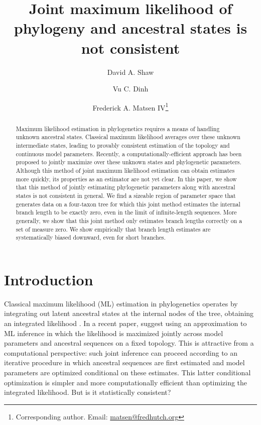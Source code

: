 \documentclass[11pt]{article}
\title{Joint maximum likelihood of phylogeny and ancestral states is not consistent}
\author[1]{David A. Shaw}
\author[2]{Vu C. Dinh}
\author[1]{Frederick A. Matsen IV\thanks{Corresponding author. Email: \url{matsen@fredhutch.org}}}
\affil[1]{Computational Biology Program, Fred Hutchinson Cancer Research Center\\ Seattle, WA, USA}
\affil[2]{Department of Mathematical Sciences, University of Delaware\\ Newark, DE, USA}
\date{}
\begin{document}
\renewcommand{\arraystretch}{1.2} %

\maketitle

\begin{abstract}
Maximum likelihood estimation in phylogenetics requires a means of handling unknown ancestral states.
Classical maximum likelihood averages over these unknown intermediate states, leading to provably consistent estimation of the topology and continuous model parameters.
Recently, a computationally-efficient approach has been proposed to jointly maximize over these unknown states and phylogenetic parameters.
Although this method of joint maximum likelihood estimation can obtain estimates more quickly, its properties as an estimator are not yet clear.
In this paper, we show that this method of jointly estimating phylogenetic parameters along with ancestral states is not consistent in general.
We find a sizeable region of parameter space that generates data on a four-taxon tree for which this joint method estimates the internal branch length to be exactly zero, even in the limit of infinite-length sequences.
More generally, we show that this joint method only estimates branch lengths correctly on a set of measure zero.
We show empirically that branch length estimates are systematically biased downward, even for short branches.
\end{abstract}

\newpage

\section*{Introduction}

Classical maximum likelihood (ML) estimation in phylogenetics operates by integrating out latent ancestral states at the internal nodes of the tree, obtaining an integrated likelihood \citep{Felsenstein1973-ba,Goldman1990-dk}.
In a recent paper, \citet{Sagulenko2018-xl} suggest using an approximation to ML inference in which the likelihood is maximized jointly across model parameters and ancestral sequences on a fixed topology.
This is attractive from a computational perspective: such joint inference can proceed according to an iterative procedure in which ancestral sequences are first estimated and model parameters are optimized conditional on these estimates.
This latter conditional optimization is simpler and more computationally efficient than optimizing the integrated likelihood.
But is it statistically consistent?
\end{document}
